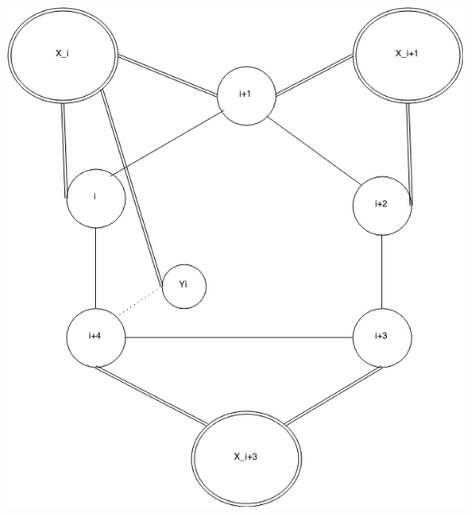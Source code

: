\documentclass[12pt]{article}
\begin{document}
\begin{minipage}{0.5\textwidth}\raggedleft
	\includegraphics[width=\linewidth]{Yi.png}
\end{minipage}
\clearpage
\end{document}
